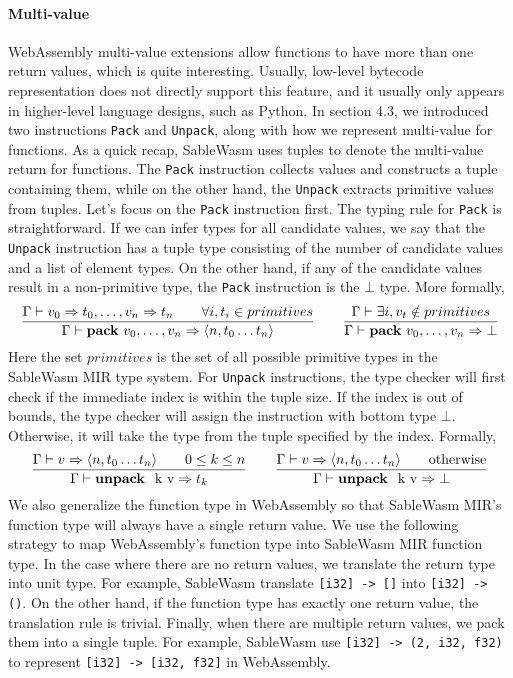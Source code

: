 \paragraph{Multi-value}
WebAssembly multi-value extensions allow functions to have more than one return
values, which is quite interesting. Usually, low-level bytecode representation
does not directly support this feature, and it usually only appears in
higher-level language designs, such as Python. In section 4.3, we introduced
two instructions \texttt{Pack} and \texttt{Unpack}, along with how we represent
multi-value for functions. As a quick recap, SableWasm uses tuples to denote the
multi-value return for functions. The \texttt{Pack} instruction collects values
and constructs a tuple containing them, while on the other hand, the
\texttt{Unpack} extracts primitive values from tuples. Let's focus on the
\texttt{Pack} instruction first. The typing rule for \texttt{Pack} is
straightforward. If we can infer types for all candidate values, we say that the
\texttt{Unpack} instruction has a tuple type consisting of the number of
candidate values and a list of element types. On the other hand, if any of the
candidate values result in a non-primitive type, the \texttt{Pack} instruction
is the $\bot$ type. More formally,
$$
    \frac
    {\Gamma \vdash v_0 \Rightarrow t_0, \dots, v_n \Rightarrow t_n \qquad \forall i, t_i \in primitives}
    {\Gamma \vdash \text{\textbf{pack} } v_0, \dots, v_n \Rightarrow \langle n, t_0 \dots t_n \rangle}
    \qquad
    \frac
    {\Gamma \vdash \exists i, v_t \notin primitives}
    {\Gamma \vdash \text{\textbf{pack} } v_0, \dots, v_n \Rightarrow \bot}
$$
Here the set $primitives$ is the set of all possible primitive types in the
SableWasm MIR type system. For \texttt{Unpack} instructions, the type checker
will first check if the immediate index is within the tuple size. If the index
is out of bounds, the type checker will assign the instruction with bottom type
$\bot$. Otherwise, it will take the type from the tuple specified by the index.
Formally,
$$
    \frac
    {\Gamma \vdash v \Rightarrow \langle n, t_0 \dots t_n \rangle \qquad 0 \leq k \leq n}
    {\Gamma \vdash \text{\textbf{unpack } k v} \Rightarrow t_k}
    \qquad
    \frac
    {\Gamma \vdash v \Rightarrow \langle n, t_0 \dots t_n \rangle \qquad \text{otherwise}}
    {\Gamma \vdash \text{\textbf{unpack } k v} \Rightarrow \bot}
$$
We also generalize the function type in WebAssembly so that SableWasm MIR's
function type will always have a single return value. We use the following
strategy to map WebAssembly's function type into SableWasm MIR function type.
In the case where there are no return values, we translate the return type into
unit type. For example, SableWasm translate \texttt{[i32] -> []} into
\texttt{[i32] -> ()}. On the other hand, if the function type has exactly one
return value, the translation rule is trivial. Finally, when there are multiple
return values, we pack them into a single tuple. For example, SableWasm use
\texttt{[i32] -> (2, i32, f32)} to represent \texttt{[i32] -> [i32, f32]} in
WebAssembly.

